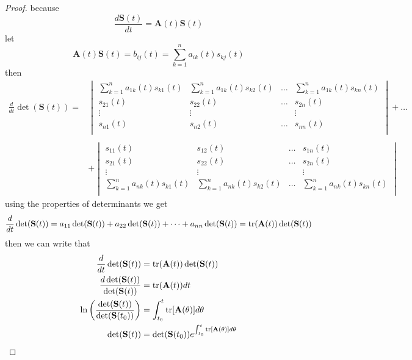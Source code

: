 \documentclass[]{article}
\begin{document}
\begin{proof}[Proof]
    because
    \[
        \frac{d\mathbf{S}(t)}{dt} = \mathbf{A}(t)\mathbf{S}(t)
    \]
    let
    \[
        \mathbf{A}(t)\mathbf{S}(t) = b_{ij}(t) = \sum_{k=1}^{n} a_{ik}(t)s_{kj}(t)
    \]
    then
    \begin{align*}
        \frac{d}{dt} \det(\mathbf{S}(t))
        = &
        \begin{vmatrix}
            \sum_{k=1}^{n} a_{1k}(t)s_{k1}(t) & \sum_{k=1}^{n} a_{1k}(t)s_{k2}(t) & \dots & \sum_{k=1}^{n} a_{1k}(t)s_{kn}(t) \\
            s_{21}(t)                         & s_{22}(t)                         & \dots & s_{2n}(t)                         \\
            \vdots                            & \vdots                            &       & \vdots                            \\
            s_{n1}(t)                         & s_{n2}(t)                         & \dots & s_{nn}(t)                         \\
        \end{vmatrix}
        +
        \dots
        \\
        \\
          & +
        \begin{vmatrix}
            s_{11}(t)                         & s_{12}(t)                         & \dots & s_{1n}(t)                         \\
            s_{21}(t)                         & s_{22}(t)                         & \dots & s_{2n}(t)                         \\
            \vdots                            & \vdots                            &       & \vdots                            \\
            \sum_{k=1}^{n} a_{nk}(t)s_{k1}(t) & \sum_{k=1}^{n} a_{nk}(t)s_{k2}(t) & \dots & \sum_{k=1}^{n} a_{nk}(t)s_{kn}(t) \\
        \end{vmatrix}
    \end{align*}
    using the properties of determinants we get
    \[
        \frac{d}{dt} \det(\mathbf{S}(t)) = a_{11}\det(\mathbf{S}(t)) + a_{22}\det(\mathbf{S}(t)) +\dots+a_{nn}\det(\mathbf{S}(t)) = \trace(\mathbf{A}(t))\det(\mathbf{S}(t))
    \]
    then we can write that
    \begin{align*}
        \frac{d}{dt} \det(\mathbf{S}(t))                                     & = \trace(\mathbf{A}(t))\det(\mathbf{S}(t))
        \\
        \frac{d \det(\mathbf{S}(t))}{\det(\mathbf{S}(t))}                    & = \trace(\mathbf{A}(t)) dt
        \\
        \ln \left( \frac{\det(\mathbf{S}(t))}{\det(\mathbf{S}(t_0))} \right) & = \int_{t_0}^{t}\trace[\mathbf{A}(\theta)]d\theta
        \\
        \det(\mathbf{S}(t))                                                  & = \det(\mathbf{S}(t_0))e^{\int_{t_0}^{t}\trace[\mathbf{A}(\theta)]d\theta}
    \end{align*}
\end{proof}
\end{document}
